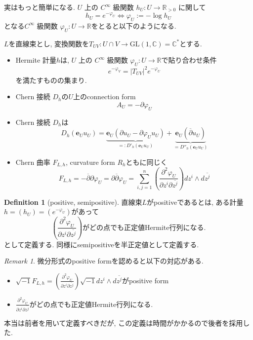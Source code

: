 \documentclass[dvipdfmx,a4paper,11pt]{article} %
\theoremstyle{definition}
\newtheorem{defn}[thm]{Definition}
\theoremstyle{remark}
\newtheorem{rem}[thm]{Remark}
\numberwithin{equation}{section}
\newcommand{\R}{\mathbb{R}}
\newcommand{\C}{\mathbb{C}}
\begin{document}
実はもっと簡単になる. \(U\) 上の \(C^{\infty}\) 級関数 \(h_U : U \to \R_{>0}\) 
に関して
$$
h_U = e^{- \varphi_U} \Leftrightarrow \varphi_U:= -\log h_U
$$
となる\(C^{\infty}\) 級関数 \(\varphi_U: U \to \R\)をとると以下のようになる. 

\begin{tcolorbox}[mybox]
$L$を直線束とし, 変換関数を\({T_{UV}} : U \cap V \to \mathrm{GL}(1,\C)=\C^{*}\)とする. 
\begin{itemize}
\item Hermite 計量$h$は, \(U\) 上の \(C^{\infty}\) 級関数 \(\varphi_U: U \to \R\)で貼り合わせ条件
\[
e^{- \varphi_V}
 =|T_{UV}|^2 e^{- \varphi_U}
\]
を満たすものの集まり.
\item Chern 接続 $D_h$の$U$上のconnection form 
$$
A_U=- \partial \varphi_U
$$
\item Chern 接続 $D_h$は
$$
D_{h}(\mathbf{e}_U u_U)
=
\underbrace{\mathbf{e}_U (\partial u_U - \partial \varphi_U u_U)}_
{=:D'_{h}(\mathbf{e}_U u_U)}
+
\underbrace{\mathbf{e}_U (\overline{\partial} u_U )}_{=D''_{h}(\mathbf{e}_U u_U)}
$$
\item Chern 曲率 $F_{L,h}$, curvature form $R_h$ともに同じく
$$
F_{L,h}
=-\overline{\partial}\partial \varphi_U
=\partial \overline{\partial}\varphi_U
= \sum_{i, j=1}^{n}
\left(
\frac{\partial^2 \varphi_U }{\partial z^i \partial \overline{z^j}} 
\right)
dz^i \wedge d \overline{z^j}
$$
\end{itemize}
 \end{tcolorbox}
 
 \begin{defn}[positive, semipositive]
 直線束$L$がpositiveであるとは, 
 ある計量$h = (h_{U})=(e^{-\varphi_{U}})$があって
 $$
 \left(
\frac{\partial^2 \varphi_U }{\partial z^i \partial \overline{z^j}} 
\right)
\text{がどの点でも正定値Hermite行列になる.}
 $$
 として定義する. 同様にsemipositiveを半正定値として定義する. 
 \end{defn}
 \begin{rem}
 微分形式のpositive formを認めると以下の対応がある. 
 \begin{itemize}
 \item $ \sqrt{-1} F_{L,h}=
 \left(
\frac{\partial^2 \varphi_U }{\partial z^i \partial \overline{z^j}} 
\right)
\sqrt{-1}dz^i \wedge d \overline{z^j} $がpositive form
 \item $ \frac{\partial^2 \varphi_U }{\partial z^i \partial \overline{z^j}} 
\text{がどの点でも正定値Hermite行列になる.}$
 \end{itemize}
本当は前者を用いて定義すべきだが, この定義は時間がかかるので後者を採用した. 
 \end{rem}
\end{document}
